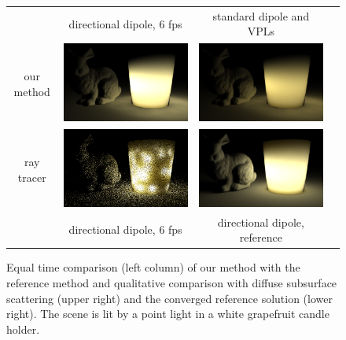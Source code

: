 \begin{figure}
\begin{tabular}{@{}c@{$\,$}c@{}c@{}c@{}}
& directional dipole, 6 fps & standard dipole and VPLs \\
\begin{sideways}\hspace*{1.5em}our method\end{sideways} &
\includegraphics[width=0.48\columnwidth]{figures/candle_holder_directional_6fps.png} &
\includegraphics[width=0.48\columnwidth]{figures/candle_holder_jensen_converged.png} \\[-4pt]
\begin{sideways}\hspace*{1.7em}ray tracer\end{sideways} &
\includegraphics[width=0.48\columnwidth]{figures/scene_comparison_optix_6fps.png} &
\includegraphics[width=0.48\columnwidth]{figures/scene_comparison_converged.png} \\[-0.5ex]
& directional dipole, 6 fps & directional dipole, reference \\[-1ex]
\end{tabular}
\caption{Equal time comparison (left column) of our method with the reference method and qualitative comparison with diffuse subsurface scattering (upper right) and the converged reference solution (lower right). The scene is lit by a point light in a white grapefruit candle holder.} %
\label{fig:optixcomparison}
\end{figure}

